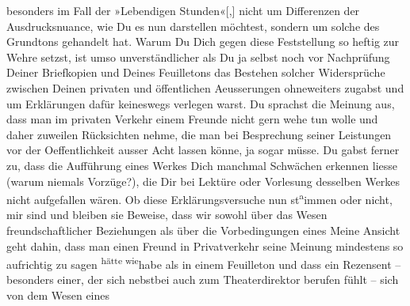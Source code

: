 \begin{ledgroupsized}[t]{13cm}
               besonders im Fall der »Lebendigen
                  Stunden«{[},{]} nicht um Differenzen der Ausdrucksnuance, wie
               Du es nun darstellen möchtest, sondern um solche des Grundtons gehandelt hat.\pend
           \pstart
           Warum Du Dich gegen diese Feststellung so heftig zur Wehre setzst, ist umso
               unverständlicher als Du ja selbst noch vor Nachprüfung Deiner Briefkopien und Deines
                  Feuilletons das Bestehen
               solcher Widersprüche zwischen Deinen privaten und öffentlichen Aeusserungen
               ohneweiters zugabst und um Erklärungen dafür keineswegs verlegen warst. Du sprachst
               die Meinung aus, dass man im privaten Verkehr einem Freunde nicht gern wehe tun wolle
               und daher zuweilen Rücksichten nehme, die man bei Besprechung seiner Leistungen vor
               der Oeffentlichkeit ausser Acht lassen könne, ja sogar müsse. Du gabst ferner zu,
               dass die Aufführung eines Werkes Dich manchmal Schwächen erkennen liesse (warum
               niemals Vorzüge?), die Dir bei Lektüre oder Vorlesung desselben Werkes nicht
               aufgefallen wären. Ob diese Erklärungsversuche nun st\substVorne{}\textsuperscript{a}\substDazwischen{}i\substHinten{}mmen oder nicht, mir sind und bleiben sie Beweise, dass wir sowohl über das
               Wesen freundschaftlicher Beziehungen als über die Vorbedingungen eines \label{T_L03521-4v}\label{T_L03521-4h}{ }{\pb}Meine Ansicht geht dahin, dass man
               einen Freund in Privatverkehr seine Meinung mindestens so aufrichtig zu sagen \substVorne{}\textsuperscript{hätte wie}{\allowbreak}\substDazwischen{}habe als\substHinten{} in einem Feuilleton und dass ein Rezensent – besonders einer, der sich
               nebstbei auch zum Theaterdirektor berufen fühlt – sich von dem Wesen eines

\end{ledgroupsized}
